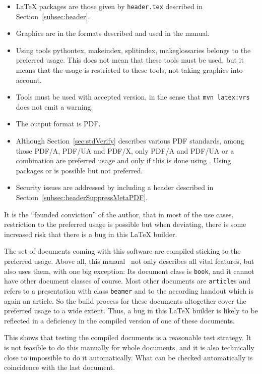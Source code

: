 \begin{itemize}
  Among the document classes provided by KOMA script 
  described in~\cite{KomaAnl23}, 
  only \texttt{scrlttr2} is preferred usage. 
  It replaces \texttt{letter}. 
  \item \LaTeX{} packages are those given by \texttt{header.tex} 
  described in Section~\ref{subsec:header}. 
  \item Graphics are in the formats described and used in the manual. 
  \item Using tools pythontex, makeindex, splitindex, makeglossaries 
  belongs to the preferred usage. 
  This does not mean that these tools must be used, 
  but it means that the usage is restricted to these tools, not taking graphics into account. 
  \item Tools must be used with accepted version, 
  in the sense that \texttt{mvn latex:vrs} does not emit a warning. 
  \item The output format is PDF\@. 
  \item Although Section~\ref{sec:stdVerify} describes various PDF standards, 
  among those PDF/A, PDF/UA and PDF/X, 
  only PDF/A and PDF/UA or a combination are preferred usage and only if this is done using . 
  Using packages  or  is possible but not preferred. 
  \item 
  Security issues are addressed by including a header described in Section~\ref{subsec:headerSuppressMetaPDF}. 
\end{itemize}


It is the ``founded conviction'' of the author, that in most of the use cases, 
restriction to the preferred usage is possible 
but when deviating, there is some increased risk 
that there is a bug in this \LaTeX{} builder. 

The set of documents coming with this software 
are compiled sticking to the preferred usage. 
Above all, this manual~\cite{LatexPlugin} not only describes all vital features, 
but also uses them, with one big exception: Its document class is \texttt{book}, 
and it cannot have other document classes of course. 
Most other documents are \texttt{article}s 
and~\cite{PresBeamer} refers to a presentation with class \texttt{beamer} 
and to the according handout which is again an article. 
So the build process for these documents altogether 
cover the preferred usage to a wide extent. 
Thus, a bug in this \LaTeX{} builder 
is likely to be reflected in a deficiency 
in the compiled version of one of these documents. 

This shows that testing the compiled documents is a reasonable test strategy. 
It is not feasible to do this manually for whole documents, 
and it is also technically close to impossible to do it automatically. 
What can be checked automatically is coincidence with the last document. 


